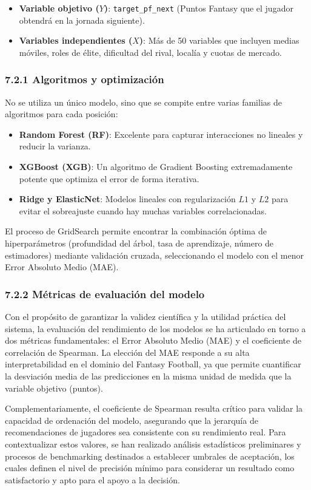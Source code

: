 \begin{itemize}
\item \textbf{Variable objetivo ($Y$)}: \texttt{target\_pf\_next} (Puntos Fantasy
que el jugador obtendrá en la jornada siguiente).
\item \textbf{Variables independientes ($X$)}: Más de 50 variables que incluyen
medias móviles, roles de élite, dificultad del rival, localía y cuotas de
mercado.
\end{itemize}
 
\subsubsection{7.2.1 Algoritmos y optimización}
No se utiliza un único modelo, sino que se compite entre varias familias de
algoritmos para cada posición:
 
\begin{itemize}
\item \textbf{Random Forest (RF)}: Excelente para capturar interacciones no
lineales y reducir la varianza.
\item \textbf{XGBoost (XGB)}: Un algoritmo de Gradient Boosting extremadamente
potente que optimiza el error de forma iterativa.
\item \textbf{Ridge y ElasticNet}: Modelos lineales con regularización $L1$ y
$L2$ para evitar el sobreajuste cuando hay muchas variables
correlacionadas.
\end{itemize}
 
El proceso de GridSearch permite encontrar la combinación óptima de
hiperparámetros (profundidad del árbol, tasa de aprendizaje, número de
estimadores) mediante validación cruzada, seleccionando el modelo con el menor
Error Absoluto Medio (MAE).
 
\subsubsection{7.2.2 Métricas de evaluación del modelo}
Con el propósito de garantizar la validez científica y la utilidad práctica del
sistema, la evaluación del rendimiento de los modelos se ha articulado en torno
a dos métricas fundamentales: el Error Absoluto Medio (MAE) y el coeficiente de
correlación de Spearman. La elección del MAE responde a su alta
interpretabilidad en el dominio del Fantasy Football, ya que permite cuantificar
la desviación media de las predicciones en la misma unidad de medida que la
variable objetivo (puntos).
 
Complementariamente, el coeficiente de Spearman resulta crítico para validar la
capacidad de ordenación del modelo, asegurando que la jerarquía de
recomendaciones de jugadores sea consistente con su rendimiento real. Para
contextualizar estos valores, se han realizado análisis estadísticos
preliminares y procesos de benchmarking destinados a establecer umbrales de
aceptación, los cuales definen el nivel de precisión mínimo para considerar un
resultado como satisfactorio y apto para el apoyo a la decisión.
 
